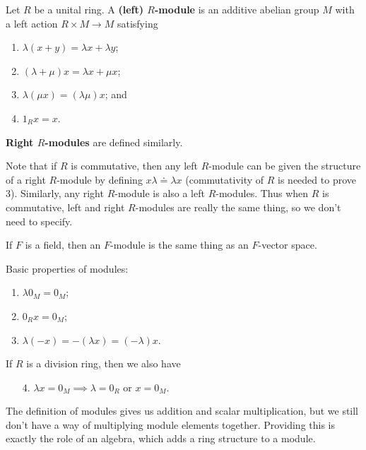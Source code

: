 \documentclass[twoside,10pt]{report}
\begin{document}
\begin{defn}[]
	Let $R$ be a unital ring. A \textbf{(left) $R$-module} is an additive abelian group $M$ with a left action $R \times M \to  M$ satisfying
\begin{enumerate}
	\item $\lambda(x+y) = \lambda x + \lambda y$;
	\item $(\lambda + \mu)x = \lambda x + \mu x$;
	\item $\lambda(\mu x) = (\lambda \mu)x$; and
	\item $1_{R}x = x$.
\end{enumerate}
\textbf{Right $R$-modules} are defined similarly.
\end{defn}

Note that if $R$ is commutative, then any left $R$-module can be given the structure of a right $R$-module by defining $x \lambda \doteq \lambda x$ (commutativity of $R$ is needed to prove 3). Similarly, any right $R$-module is also a left $R$-modules. Thus when $R$ is commutative, left and right $R$-modules are really the same thing, so we don't need to specify.

If $F$ is a field, then an $F$-module is the same thing as an $F$-vector space.

\begin{prop}
Basic properties of modules:
\begin{enumerate}
	\item $\lambda 0_{M} = 0_{M}$;
	\item $0_{R}x = 0_{M}$;
	\item $\lambda(-x) = -(\lambda x) = (-\lambda) x$.
\end{enumerate}
If $R$ is a division ring, then we also have
\begin{enumerate}
	\item[4.] $\lambda x = 0_{M} \implies \lambda=0_{R}$ or $x = 0_{M}$.
\end{enumerate}
\end{prop}

The definition of modules gives us addition and scalar multiplication, but we still don't have a way of multiplying module elements together. Providing this is exactly the role of an algebra, which adds a ring structure to a module. 
\end{document}
